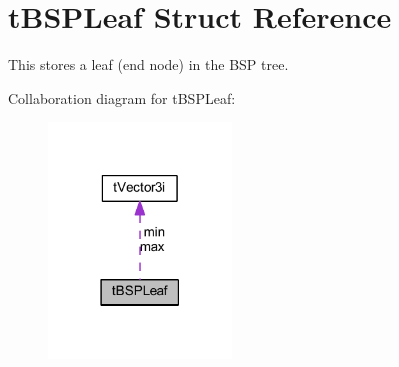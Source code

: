 \hypertarget{structt_b_s_p_leaf}{}\section{t\+B\+S\+P\+Leaf Struct Reference}
\label{structt_b_s_p_leaf}


This stores a leaf (end node) in the B\+SP tree.  




Collaboration diagram for t\+B\+S\+P\+Leaf\+:
\nopagebreak
\begin{figure}[H]
\begin{center}
\leavevmode
\includegraphics[width=138pt]{structt_b_s_p_leaf__coll__graph}
\end{center}
\end{figure}
